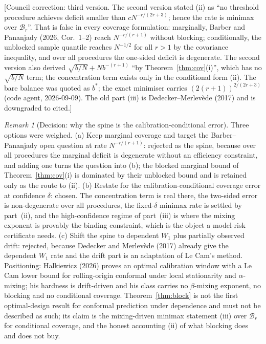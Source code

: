 \documentclass[11pt,a4paper]{article}
\newcommand{\corr}[1]{{\color{ox}\textsf{\small [Council correction: #1]}}}
\theoremstyle{plain}
\theoremstyle{definition}
\theoremstyle{remark}
\newtheorem*{remark}{Remark}
\begin{document}
\corr{third version. The second version stated (ii) as ``no threshold procedure achieves deficit smaller than $cN^{-r/(2r+3)}$; hence the rate is minimax over $\mathcal B_r$''. That is false in every coverage formulation: marginally, Barber and Pananjady (2026, Cor.~1--2) reach $N^{-r/(r+1)}$ without blocking; conditionally, the unblocked sample quantile reaches $N^{-1/2}$ for all $r>1$ by the covariance inequality, and over all procedures the one-sided deficit is degenerate. The second version also derived $\sqrt{b/N}+Nb^{-(r+1)}$ ``by Theorem~\ref{thm:cov}(i)'', which has no $\sqrt{b/N}$ term; the concentration term exists only in the conditional form (ii). The bare balance was quoted as $b^*$; the exact minimiser carries $(2(r+1))^{2/(2r+3)}$ (code agent, 2026-09-09). The old part (iii) is Dedecker--Merlev\`ede (2017) and is downgraded to cited.}
\begin{remark}[Decision: why the spine is the calibration-conditional error]
Three options were weighed. (a) Keep marginal coverage and target the Barber--Pananjady open question at rate $N^{-r/(r+1)}$: rejected as the spine, because over all procedures the marginal deficit is degenerate without an efficiency constraint, and adding one turns the question into (b); the blocked marginal bound of Theorem~\ref{thm:cov}(i) is dominated by their unblocked bound and is retained only as the route to (ii). (b) Restate for the calibration-conditional coverage error at confidence $\delta$: chosen. The concentration term is real there, the two-sided error is non-degenerate over all procedures, the fixed-$\delta$ minimax rate is settled by part~(ii), and the high-confidence regime of part~(iii) is where the mixing exponent is provably the binding constraint, which is the object a model-risk certificate needs. (c) Shift the spine to dependent $W_1$ plus partially observed drift: rejected, because Dedecker and Merlev\`ede (2017) already give the dependent $W_1$ rate and the drift part is an adaptation of Le Cam's method. Positioning: Halkiewicz (2026) proves an optimal calibration window with a Le Cam lower bound for rolling-origin conformal under local stationarity and $\alpha$-mixing; his hardness is drift-driven and his class carries no $\beta$-mixing exponent, no blocking and no conditional coverage. Theorem~\ref{thm:block} is not the first optimal-design result for conformal prediction under dependence and must not be described as such; its claim is the mixing-driven minimax statement (iii) over $\mathcal B_r$ for conditional coverage, and the honest accounting (ii) of what blocking does and does not buy.
\end{remark}
\end{document}
